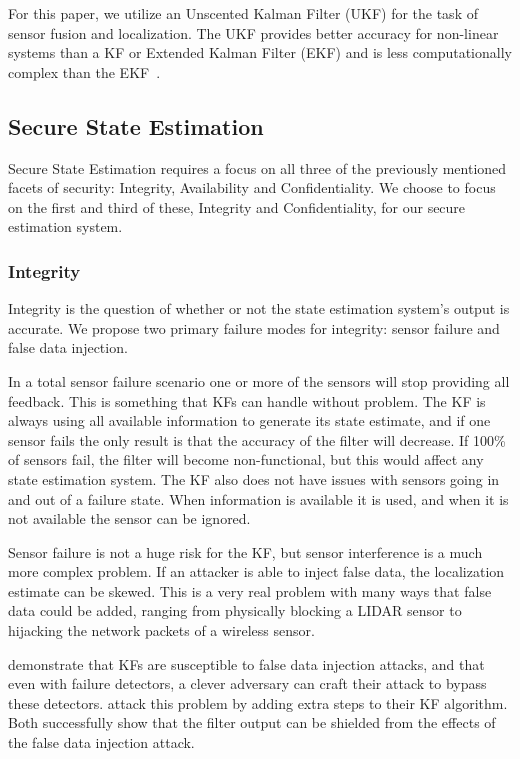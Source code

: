 \documentclass[conference]{IEEEtran}
\begin{document}
For this paper, we utilize an Unscented Kalman Filter (UKF) for the task of sensor fusion and localization. The UKF provides better accuracy for non-linear systems than a KF or Extended Kalman Filter (EKF) and is less computationally complex than the EKF~\cite{Julier1997}.

\subsection{Secure State Estimation}
Secure State Estimation requires a focus on all three of the previously mentioned facets of security: Integrity, Availability and Confidentiality. We choose to focus on the first and third of these, Integrity and Confidentiality, for our secure estimation system.

\subsubsection{Integrity}
Integrity is the question of whether or not the state estimation system's output is accurate. We propose two primary failure modes for integrity: sensor failure and false data injection.

In a total sensor failure scenario one or more of the sensors will stop providing all feedback. This is something that KFs can handle without problem. The KF is always using all available information to generate its state estimate, and if one sensor fails the only result is that the accuracy of the filter will decrease. If 100\% of sensors fail, the filter will become non-functional, but this would affect any state estimation system. The KF also does not have issues with sensors going in and out of a failure state. When information is available it is used, and when it is not available the sensor can be ignored.

Sensor failure is not a huge risk for the KF, but  sensor interference is a much more complex problem. If an attacker is able to inject false data, the localization estimate can be skewed. This is a very real problem with many ways that false data could be added, ranging from physically blocking a LIDAR sensor to hijacking the network packets of a wireless sensor.

\textcite{Mo2010, Yang2013} demonstrate that KFs are susceptible to false data injection attacks, and that even with failure detectors, a clever adversary can craft their attack to bypass these detectors. \textcite{Bezzo_2014, Mo2014} attack this problem by adding extra steps to their KF algorithm. Both successfully show that the filter output can be shielded from the effects of the false data injection attack.
\end{document}
